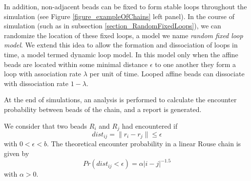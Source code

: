 \documentclass[12pt]{book}
\begin{document}
In addition, non-adjacent beads can be fixed to form stable loops throughout the simulation (see Figure \ref{figure_exampleOfChains} left panel). In the course of simulation (such as in subsection \ref{section_RandomFixedLoops}), we can randomize the location of these fixed loops, a model we name \textit{random fixed loop model}. We extend this idea to allow the formation and dissociation of loops in time, a model termed dynamic loop model. In this model only when the affine beads are located within some minimal distance $\epsilon$ to one another they form a loop with association rate $\lambda$ per unit of time. Looped affine beads can dissociate with dissociation rate $1-\lambda$.

At the end of simulations, an analysis is performed to calculate the encounter probability between beads of the chain, and a report is generated.  

We consider that two beads $R_i$ and $R_j$ had encountered if
\begin{equation*}
 dist_{ij}=\|r_i-r_j\|\leq \epsilon
\end{equation*}
with $0<\epsilon <b$. The theoretical encounter probability in a linear Rouse chain is given by 
\begin{equation}
Pr(dist_{ij}<\epsilon)= \alpha |i-j|^{-1.5}
\end{equation}
with $\alpha>0$. 
\end{document}
